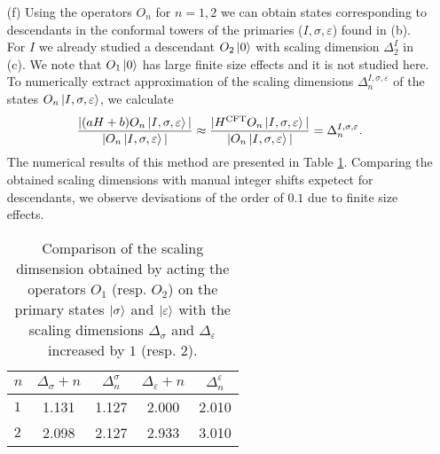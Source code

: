 \documentclass[10pt, a4paper]{article}
\begin{document}
{\begin{enumerate}
\begin{table}
      \caption{Calculation of the approximative critical exponents of the 1+1D TFIM phase transition using the approximative scaling dimensions $\Delta_{\sigma}$ and $\Delta_{\varepsilon}$ for two finite system size $L=16$ and $L=18$. The exact values for these exponents are known and compared with the approximative results to show an improvement of the agreement with increasing system size. The expression in terms of primary scaling dimensions and exact values for these exponents can be found at \cite{crit_exp}. \label{crit_exp}}
  \end{table}
  \item[(f)] Using the operators $O_n$ for $n =1, 2$ we can obtain states corresponding to descendants in the conformal towers of the primaries ($I, \sigma, \varepsilon$) found in (b). For $I$ we already studied a descendant $O_2\ket{0}$ with scaling dimension $\Delta_2^I$ in (c). We note that $O_1\ket{0}$ has large finite size effects and it is not studied here. To numerically extract approximation of the scaling dimensions $\Delta_{n}^{I, \sigma, \varepsilon}$ of the states $O_n \ket{I, \sigma, \varepsilon}$, we calculate
  \begin{align*}
     \frac{|(a H + b) O_n \ket{I, \sigma, \varepsilon}|}{|O_n \ket{I, \sigma, \varepsilon}|} \approx \frac{| H^{\rm CFT} O_n \ket{I, \sigma, \varepsilon}|}{|O_n \ket{I, \sigma, \varepsilon}|} = \Delta_{n}^{I, \sigma, \varepsilon}. 
  \end{align*}
  The numerical results of this method are presented in Table \ref{des}. Comparing the obtained scaling dimensions with manual integer shifts expetect for descendants, we observe devisations of the order of $0.1$ due to finite size effects. 
  \begin{table}
    \centering
    \begin{tabular}{lcccc}
      \toprule
            $n$ & $\Delta_\sigma + n$ & $\Delta_{n}^\sigma$ & $\Delta_\varepsilon + n$ & $\Delta_{n}^\varepsilon$ \\
      \midrule
      $1$ & 1.131 & 1.127 & 2.000 & 2.010 \\
      $2$ & 2.098 & 2.127 & 2.933 & 3.010 \\
      \bottomrule
      \end{tabular}
    \caption{Comparison of the scaling dimsension obtained by acting the operators $O_1$  (resp. $O_2$) on the primary states $\ket{\sigma}$ and $\ket{\varepsilon}$ with the scaling dimensions $\Delta_\sigma$ and $\Delta_\varepsilon$ increased by $1$ (resp. $2$). \label{des}}
  \end{table}

\end{enumerate}}
\end{document}
